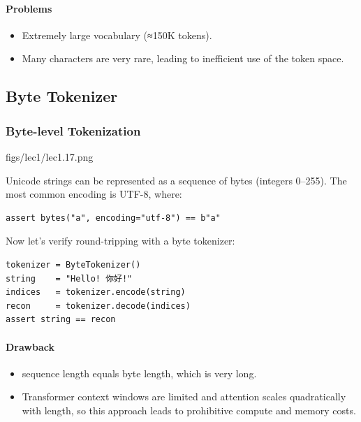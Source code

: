 \paragraph{Problems}
\begin{itemize}[leftmargin=*]
  \item Extremely large vocabulary (≈150K tokens).
  \item Many characters are very rare, leading to inefficient use of the token space.
\end{itemize}

\subsection{Byte Tokenizer}
\subsubsection*{Byte-level Tokenization}

\MarginImageWithNote
  {figs/lec1/lec1.17.png}
  {}
  
Unicode strings can be represented as a sequence of bytes (integers 0–255). The most common encoding is UTF-8, where:

\begin{verbatim}
assert bytes("a", encoding="utf-8") == b"a"
\end{verbatim}

Now let's verify round-tripping with a byte tokenizer:

\begin{verbatim}
tokenizer = ByteTokenizer()
string    = "Hello! 你好!"
indices   = tokenizer.encode(string)
recon     = tokenizer.decode(indices)
assert string == recon
\end{verbatim}


\paragraph{Drawback}
\begin{itemize}[leftmargin=*]
  \item sequence length equals byte length, which is very long.
  \item Transformer context windows are limited and attention scales quadratically with length,  so this approach leads to prohibitive compute and memory costs.
\end{itemize}



\clearpage

